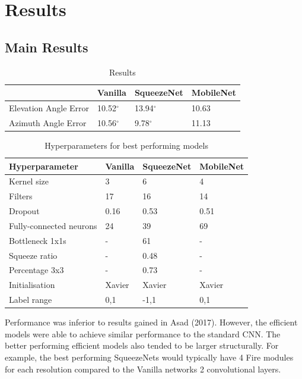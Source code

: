 \documentclass{article}
\begin{document}
\section{Results}

\subsection{Main Results}
\begin{table}[h!]
  \begin{center}
    \caption{Results}
    \label{tab:table1}
    \begin{tabular}{l|l|l|l}
      \textbf{} & \textbf{Vanilla} &                          \textbf{SqueezeNet} & \textbf{MobileNet}\\
      \hline
      Elevation Angle Error & 10.52$^{\circ}$ & 13.94$^{\circ}$ & 10.63\\
      Azimuth Angle Error & 10.56$^{\circ}$  & 9.78$^{\circ}$ & 11.13\\

    \end{tabular}
  \end{center}
\end{table}

\begin{table}[h!]
  \begin{center}
    \caption{Hyperparameters for best performing models}
    \label{tab:params}
    \begin{tabular}{l|l|l|l}
      \textbf{Hyperparameter} & \textbf{Vanilla} &                          \textbf{SqueezeNet} & \textbf{MobileNet}\\
      \hline
      Kernel size & 3 & 6 & 4\\
      Filters & 17 & 16 & 14\\
      Dropout & 0.16 & 0.53 & 0.51\\
      Fully-connected neurons & 24 & 39 & 69\\
      Bottleneck 1x1s & - & 61 & - \\
      Squeeze ratio & - & 0.48 & - \\
      Percentage 3x3 & - & 0.73 & - \\
      Initialisation & Xavier & Xavier & Xavier \\
      Label range & 0,1 & -1,1 & 0,1
    \end{tabular}
  \end{center}
\end{table}

Performance was inferior to results gained in Asad (2017). However, the efficient models were able to achieve similar performance to the standard CNN. The better performing efficient models also tended to be larger structurally. For example, the best performing SqueezeNets would typically have 4 Fire modules for each resolution compared to the Vanilla networks 2 convolutional layers.\\
\end{document}
